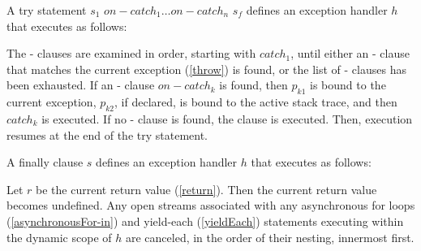 \documentclass{article}
\begin{document}






\LMHash{}
A try statement \TRY{} $s_1$ $on-catch_1 \ldots  on-catch_n$ \FINALLY{} $s_f$  defines an exception handler $h$ that executes as follows:

\LMHash{}
The \ON{}-\CATCH{} clauses are examined in order, starting with $catch_1$, until either an \ON{}-\CATCH{} clause that matches the current exception (\ref{throw}) is found, or the list of \ON{}-\CATCH{} clauses has been exhausted. If an \ON{}-\CATCH{} clause $on-catch_k$ is found, then $p_{k1}$ is bound to the current exception,  $p_{k2}$, if declared,  is bound to the active stack trace, and then $catch_k$ is executed. If no \ON{}-\CATCH{} clause is found, the \FINALLY{} clause is executed. Then, execution resumes at the end of the try statement.


\LMHash{}
A finally clause \FINALLY{} $s$ defines an exception handler $h$ that executes as follows:

\LMHash{}
Let $r$ be the current return value (\ref{return}). Then the current return value becomes undefined. Any open streams associated with any asynchronous for loops (\ref{asynchronousFor-in}) and yield-each (\ref{yieldEach}) statements executing within the dynamic scope of $h$ are canceled, in the order of their nesting, innermost first.
\end{document}
